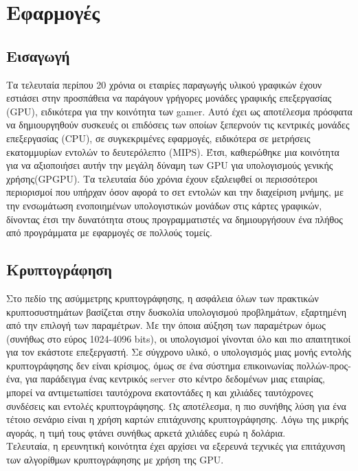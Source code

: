 \chapter{Εφαρμογές}
\section{Εισαγωγή}
Τα τελευταία περίπου 20 χρόνια οι εταιρίες παραγωγής υλικού γραφικών έχουν εστιάσει στην προσπάθεια να παράγουν γρήγορες μονάδες γραφικής επεξεργασίας (GPU), ειδικότερα για την κοινότητα των gamer. Αυτό έχει ως αποτέλεσμα πρόσφατα να δημιουργηθούν συσκευές οι επιδόσεις των οποίων ξεπερνούν τις κεντρικές μονάδες επεξεργασίας (CPU), σε συγκεκριμένες εφαρμογές, ειδικότερα σε μετρήσεις εκατομμυρίων εντολών το δευτερόλεπτο (MIPS). Έτσι, καθιερώθηκε μια κοινότητα για να αξιοποιήσει αυτήν την μεγάλη δύναμη των GPU για υπολογισμούς γενικής χρήσης(GPGPU). Τα τελευταία δύο χρόνια έχουν εξαλειφθεί οι περισσότεροι περιορισμοί που υπήρχαν όσον αφορά το σετ εντολών και την διαχείριση μνήμης, με την ενσωμάτωση ενοποιημένων υπολογιστικών μονάδων στις κάρτες γραφικών, δίνοντας έτσι την δυνατότητα στους προγραμματιστές να δημιουργήσουν ένα πλήθος από προγράμματα με εφαρμογές σε πολλούς τομείς.
\section{Κρυπτογράφηση}
Στο πεδίο της ασύμμετρης κρυπτογράφησης, η ασφάλεια όλων των πρακτικών κρυπτοσυστημάτων βασίζεται στην δυσκολία υπολογισμού προβλημάτων, εξαρτημένη από την επιλογή των παραμέτρων. Με την όποια αύξηση των παραμέτρων όμως (συνήθως στο εύρος 1024-4096 bits), οι υπολογισμοί γίνονται όλο και πιο απαιτητικοί για τον εκάστοτε επεξεργαστή. Σε σύγχρονο υλικό, ο υπολογισμός μιας μονής εντολής κρυπτογράφησης δεν είναι κρίσιμος, όμως σε ένα σύστημα επικοινωνίας πολλών-προς-ένα, για παράδειγμα ένας κεντρικός server στο κέντρο δεδομένων μιας εταιρίας, μπορεί να αντιμετωπίσει ταυτόχρονα εκατοντάδες η και χιλιάδες ταυτόχρονες συνδέσεις και εντολές κρυπτογράφησης. Ως αποτέλεσμα, η πιο συνήθης λύση για ένα τέτοιο σενάριο είναι η χρήση καρτών επιτάχυνσης κρυπτογράφησης. Λόγω της μικρής αγοράς, η τιμή τους φτάνει συνήθως αρκετά χιλιάδες ευρώ η δολάρια.\\
Τελευταία, η ερευνητική κοινότητα έχει αρχίσει να εξερευνά τεχνικές για επιτάχυνση των αλγορίθμων κρυπτογράφησης με χρήση της GPU.  




